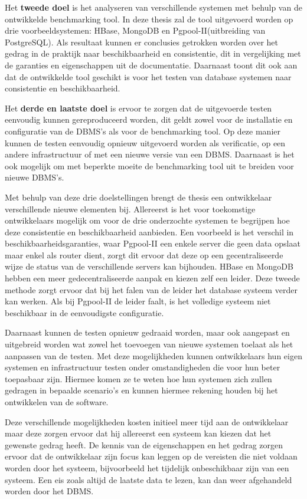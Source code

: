 Het \textbf{tweede doel} is het analyseren van verschillende systemen met behulp van de ontwikkelde benchmarking tool. In deze thesis zal de tool uitgevoerd worden op drie voorbeeldsystemen: HBase, MongoDB en Pgpool-II(uitbreiding van PostgreSQL). Als resultaat kunnen er conclusies getrokken worden over het gedrag in de praktijk naar beschikbaarheid en consistentie, dit in vergelijking met de garanties en eigenschappen uit de documentatie. Daarnaast toont dit ook aan dat de ontwikkelde tool geschikt is voor het testen van database systemen naar consistentie en beschikbaarheid. 

Het \textbf{derde en laatste doel} is ervoor te zorgen dat de uitgevoerde testen eenvoudig kunnen gereproduceerd worden, dit geldt zowel voor de installatie en configuratie van de DBMS's als voor de benchmarking tool. Op deze manier kunnen de testen eenvoudig opnieuw uitgevoerd worden als verificatie, op een andere infrastructuur of met een nieuwe versie van een DBMS. Daarnaast is het ook mogelijk om met beperkte moeite de benchmarking tool uit te breiden voor nieuwe DBMS's.  

Met behulp van deze drie doelstellingen brengt de thesis een ontwikkelaar verschillende nieuwe elementen bij. Allereerst is het voor toekomstige ontwikkelaars mogelijk om voor de drie onderzochte systemen te begrijpen hoe deze consistentie en beschikbaarheid aanbieden. Een voorbeeld is het verschil in beschikbaarheidsgaranties, waar Pgpool-II een enkele server die geen data opslaat maar enkel als router dient, zorgt dit ervoor dat deze op een gecentraliseerde wijze de status van de verschillende servers kan bijhouden. HBase en MongoDB hebben een meer gedecentraliseerde aanpak en kiezen zelf een leider. Deze tweede methode zorgt ervoor dat bij het falen van de leider het database systeem verder kan werken. Als bij Pgpool-II de leider faalt, is het volledige systeem niet beschikbaar in de eenvoudigste configuratie. 

Daarnaast kunnen de testen opnieuw gedraaid worden, maar ook aangepast en uitgebreid worden wat zowel het toevoegen van nieuwe systemen toelaat als het aanpassen van de testen. Met deze mogelijkheden kunnen ontwikkelaars hun eigen systemen en infrastructuur testen onder omstandigheden die voor hun beter toepasbaar zijn. Hiermee komen ze te weten hoe hun systemen zich zullen gedragen in bepaalde scenario's en kunnen hiermee rekening houden bij het ontwikkelen van de software. 

Deze verschillende mogelijkheden kosten initieel meer tijd aan de ontwikkelaar maar deze zorgen ervoor dat hij allereerst een systeem kan kiezen dat het gewenste gedrag heeft. De kennis van de eigenschappen en het gedrag zorgen ervoor dat de ontwikkelaar zijn focus kan leggen op de vereisten die niet voldaan worden door het systeem, bijvoorbeeld het tijdelijk onbeschikbaar zijn van een systeem. Een eis zoals altijd de laatste data te lezen, kan dan weer afgehandeld worden door het DBMS. 

